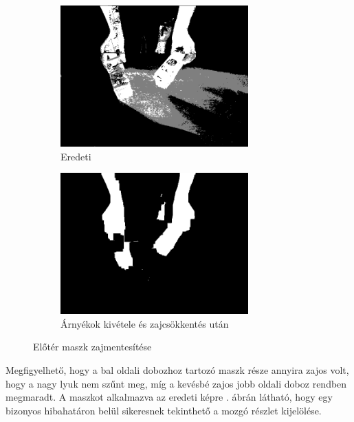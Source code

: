 \begin{figure}[tbh]
\centering
\begin{subfigure}[b]{.49\linewidth}
	\centering
	\includegraphics[width=205pt]{figures/mask343.png}
	\caption{Eredeti}
  \end{subfigure}
\begin{subfigure}[b]{.49\linewidth}
	\centering
	\includegraphics[width=205pt]{figures/mask343_fixed.png}
	\caption{Árnyékok kivétele és zajcsökkentés után}
  \end{subfigure}
\caption{Előtér maszk zajmentesítése \label{fig:erosion_dilation}}
\end{figure}

Megfigyelhető, hogy a bal oldali dobozhoz tartozó maszk része annyira zajos volt, hogy a nagy lyuk nem szűnt meg, míg a kevésbé zajos jobb oldali doboz rendben megmaradt. A maszkot alkalmazva az eredeti képre . ábrán látható, hogy egy bizonyos hibahatáron belül sikeresnek tekinthető a mozgó részlet kijelölése.


